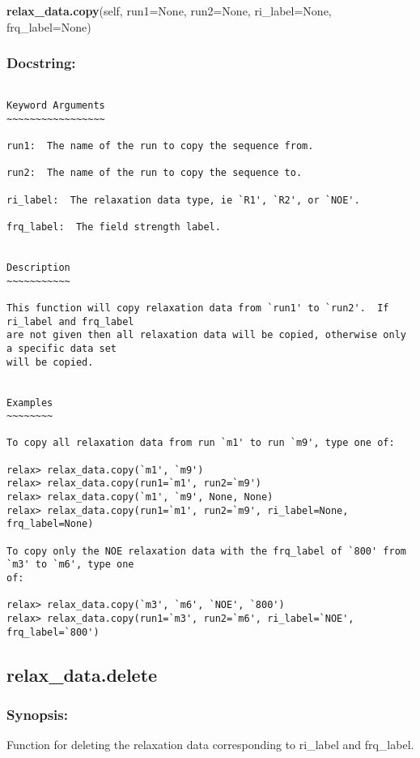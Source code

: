 \textsf{\textbf{relax\_data.copy}(self, run1=None, run2=None, ri\_label=None, frq\_label=None)
}


\subsubsection{Docstring:}

{\scriptsize
\begin{verbatim}

Keyword Arguments
~~~~~~~~~~~~~~~~~

run1:  The name of the run to copy the sequence from.

run2:  The name of the run to copy the sequence to.

ri_label:  The relaxation data type, ie `R1', `R2', or `NOE'.

frq_label:  The field strength label.


Description
~~~~~~~~~~~

This function will copy relaxation data from `run1' to `run2'.  If ri_label and frq_label
are not given then all relaxation data will be copied, otherwise only a specific data set
will be copied.


Examples
~~~~~~~~

To copy all relaxation data from run `m1' to run `m9', type one of:

relax> relax_data.copy(`m1', `m9')
relax> relax_data.copy(run1=`m1', run2=`m9')
relax> relax_data.copy(`m1', `m9', None, None)
relax> relax_data.copy(run1=`m1', run2=`m9', ri_label=None, frq_label=None)

To copy only the NOE relaxation data with the frq_label of `800' from `m3' to `m6', type one
of:

relax> relax_data.copy(`m3', `m6', `NOE', `800')
relax> relax_data.copy(run1=`m3', run2=`m6', ri_label=`NOE', frq_label=`800')
\end{verbatim}
}



\newpage

\subsection{relax\_data.delete}


\subsubsection{Synopsis:}

Function for deleting the relaxation data corresponding to ri\_label and frq\_label.


